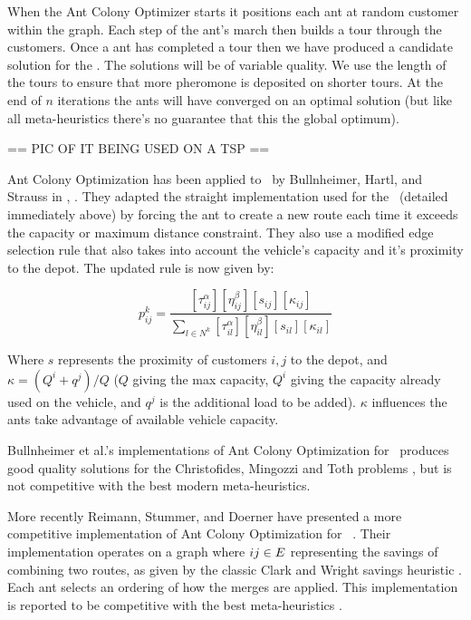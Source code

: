 When the Ant Colony Optimizer starts it positions each ant at random customer within the graph. Each step of the ant's march then builds a tour through the customers. Once a ant has completed a tour then we have produced a candidate solution for the \TSP. The solutions will be of variable quality. We use the length of the tours to ensure that more pheromone is deposited on shorter tours. At the end of $n$ iterations the ants will have converged on an optimal solution (but like all meta-heuristics there's no guarantee that this the global optimum).

== PIC OF IT BEING USED ON A TSP == 
 
Ant Colony Optimization has been applied to \VRP\ by Bullnheimer, Hartl, and Strauss in \cite{BHS:1999A}, \cite{BHS:1999B}. They adapted the straight implementation used for the \TSP\ (detailed immediately above) by forcing the ant to create a new route each time it exceeds the capacity or maximum distance constraint. They also use a modified edge selection rule that also takes into account the vehicle's capacity and it's proximity to the depot. The updated rule is now given by:

\[
   p_{ij}^k = \frac{ [\tau_{ij}^{\alpha}] [\eta_{ij}^{\beta}] [s_{ij}] [\kappa_{ij}]  }{ \sum_{l \in N^k} [\tau_{il}^{\alpha}] [\eta_{il}^{\beta}] [s_{il}] [\kappa_{il}] }
\]

Where $s$ represents the proximity of customers $i, j$ to the depot, and $\kappa = (Q^i + q^j) / Q$ ($Q$ giving the max capacity, $Q^i$ giving the capacity already used on the vehicle, and $q^j$ is the additional load to be added). $\kappa$ influences the ants take advantage of available vehicle capacity. 

Bullnheimer et al.'s implementations of Ant Colony Optimization for \VRP\ produces good quality solutions for the Christofides, Mingozzi and Toth problems \cite{CMT:1981}, but is not competitive with the best modern meta-heuristics.

More recently Reimann, Stummer, and Doerner have presented a more competitive implementation of Ant Colony Optimization for \VRP\ \cite{RSD:2002}. Their implementation operates on a graph where $ij \in E$ representing the savings of combining two routes, as given by the classic Clark and Wright savings heuristic \cite{clark:1964}. Each ant selects an ordering of how the merges are applied. This implementation is reported to be competitive with the best meta-heuristics \cite{Potvin:2009}.   
 
% 
% 

